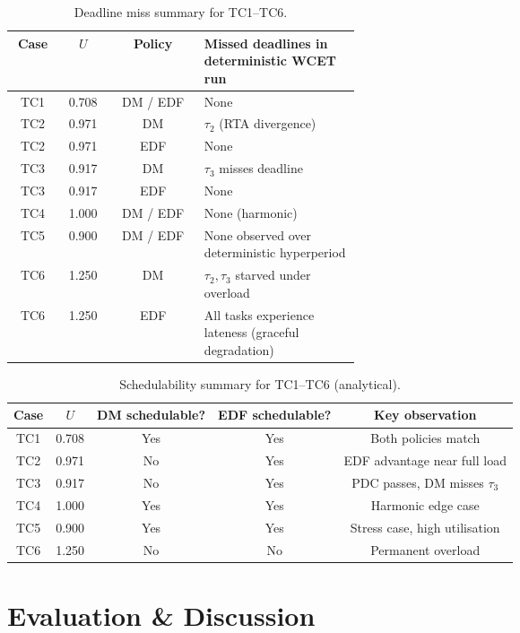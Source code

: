 \documentclass[11pt,a4paper]{article}
\begin{document}
\begin{table}[h]
\centering
\small
\begin{tabular}{|c|c|c|p{0.45\linewidth}|}
\hline
Case & \(U\) & Policy & Missed deadlines in deterministic WCET run \\
\hline
TC1 & 0.708 & DM / EDF & None \\
\hline
TC2 & 0.971 & DM & \(\tau_2\) (RTA divergence) \\
\hline
TC2 & 0.971 & EDF & None \\
\hline
TC3 & 0.917 & DM & \(\tau_3\) misses deadline \\
\hline
TC3 & 0.917 & EDF & None \\
\hline
TC4 & 1.000 & DM / EDF & None (harmonic) \\
\hline
TC5 & 0.900 & DM / EDF & None observed over deterministic hyperperiod \\
\hline
TC6 & 1.250 & DM & \(\tau_2, \tau_3\) starved under overload \\
\hline
TC6 & 1.250 & EDF & All tasks experience lateness (graceful degradation) \\
\hline
\end{tabular}
\caption{Deadline miss summary for TC1--TC6.}
\label{tab:miss-summary}
\end{table}

\begin{table}[h]
\centering
\small
\begin{tabular}{|c|c|c|c|c|}
\hline
Case & \(U\) & DM schedulable? & EDF schedulable? & Key observation \\
\hline
TC1 & 0.708 & Yes & Yes & Both policies match \\
\hline
TC2 & 0.971 & No & Yes & EDF advantage near full load \\
\hline
TC3 & 0.917 & No & Yes & PDC passes, DM misses \(\tau_3\) \\
\hline
TC4 & 1.000 & Yes & Yes & Harmonic edge case \\
\hline
TC5 & 0.900 & Yes & Yes & Stress case, high utilisation \\
\hline
TC6 & 1.250 & No & No & Permanent overload \\
\hline
\end{tabular}
\caption{Schedulability summary for TC1--TC6 (analytical).}
\label{tab:sched-summary}
\end{table}

\section{Evaluation \& Discussion}
\end{document}
